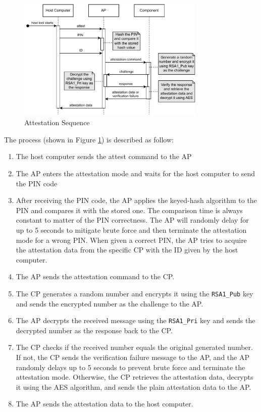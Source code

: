 \documentclass[11pt,oneside,onecolumn,letterpaper]{article}
\newcounter{alg}
\begin{document}
	\begin{figure}[h]
		\centering
		\includegraphics[width=0.8\textwidth]{pics/attest.pdf}
		\caption{Attestation Sequence}
		\label{fig:functionality_attest}
	\end{figure}
	
	The process (shown in Figure \ref{fig:functionality_attest}) is described as follow:
	\begin{enumerate}
		\item The host computer sends the attest command to the AP
		\item The AP enters the attestation mode and waits for the host computer to send the PIN code
		\item After receiving the PIN code,
		the AP applies the keyed-hash algorithm to the PIN and compares it with the stored one.
		The comparison time is always constant to matter of the PIN correctness.
		The AP will randomly delay for up to 5 seconds to mitigate brute force and then terminate the attestation mode for a wrong PIN.
		When given a correct PIN,
		the AP tries to acquire the attestation data from the specific CP with the ID given by the host computer.
		\item The AP sends the attestation command to the CP.
		\item The CP generates a random number and encrypts it using the \texttt{RSA1\_Pub} key and sends the encrypted number as the challenge to the AP.
		\item The AP decrypts the received message using the \texttt{RSA1\_Pri} key and sends the decrypted number as the response back to the CP.
		\item The CP checks if the received number equals the original generated number.
		If not,
		the CP sends the verification failure message to the AP,
		and the AP randomly delays up to 5 seconds to prevent brute force and terminate the attestation mode.
		Otherwise,
		the CP retrieves the attestation data,
		decrypts it using the AES algorithm,
		and sends the plain attestation data to the AP.
		\item The AP sends the attestation data to the host computer.
	\end{enumerate}
	
\end{document}
